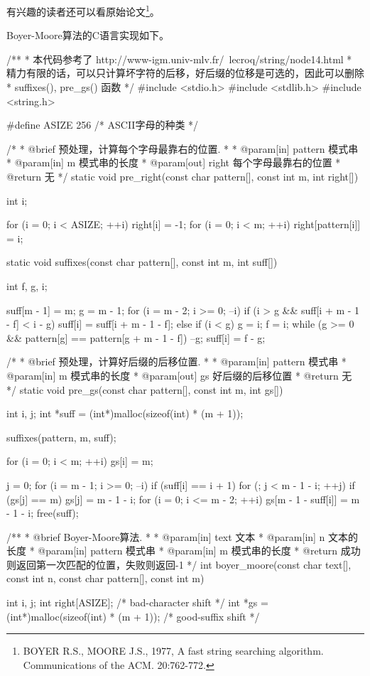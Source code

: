有兴趣的读者还可以看原始论文\footnote{BOYER R.S., MOORE J.S., 1977, A fast string searching algorithm. Communications of the ACM. 20:762-772.}。

Boyer-Moore算法的C语言实现如下。
\begin{Codex}[label=boyer_moore.c]
/**
 * 本代码参考了 http://www-igm.univ-mlv.fr/~lecroq/string/node14.html
 * 精力有限的话，可以只计算坏字符的后移，好后缀的位移是可选的，因此可以删除
 * suffixes(), pre_gs() 函数
 */
#include <stdio.h>
#include <stdlib.h>
#include <string.h>

#define ASIZE 256  /* ASCII字母的种类 */

/*
 * @brief 预处理，计算每个字母最靠右的位置.
 *
 * @param[in] pattern 模式串
 * @param[in] m 模式串的长度
 * @param[out] right 每个字母最靠右的位置
 * @return 无
 */
static void pre_right(const char pattern[], const int m, int right[]) {
    int i;

    for (i = 0; i < ASIZE; ++i) right[i] = -1;
    for (i = 0; i < m; ++i) right[pattern[i]] = i;
}


static void suffixes(const char pattern[], const int m, int suff[]) {
    int f, g, i;

    suff[m - 1] = m;
    g = m - 1;
    for (i = m - 2; i >= 0; --i) {
        if (i > g && suff[i + m - 1 - f] < i - g)
            suff[i] = suff[i + m - 1 - f];
        else {
            if (i < g)
                g = i;
            f = i;
            while (g >= 0 && pattern[g] == pattern[g + m - 1 - f])
                --g;
            suff[i] = f - g;
        }
    }
}

/*
 * @brief 预处理，计算好后缀的后移位置.
 *
 * @param[in] pattern 模式串
 * @param[in] m 模式串的长度
 * @param[out] gs 好后缀的后移位置
 * @return 无
 */
static void pre_gs(const char pattern[], const int m, int gs[]) {
    int i, j;
    int *suff = (int*)malloc(sizeof(int) * (m + 1));

    suffixes(pattern, m, suff);

    for (i = 0; i < m; ++i) gs[i] = m;

    j = 0;
    for (i = m - 1; i >= 0; --i) if (suff[i] == i + 1)
        for (; j < m - 1 - i; ++j) if (gs[j] == m)
            gs[j] = m - 1 - i;
    for (i = 0; i <= m - 2; ++i) 
        gs[m - 1 - suff[i]] = m - 1 - i;
    free(suff);
}

/**
 * @brief Boyer-Moore算法.
 *
 * @param[in] text 文本
 * @param[in] n 文本的长度
 * @param[in] pattern 模式串
 * @param[in] m 模式串的长度
 * @return 成功则返回第一次匹配的位置，失败则返回-1
 */
int boyer_moore(const char text[], const int n, 
                const char pattern[], const int m) {
    int i, j;
    int right[ASIZE];  /* bad-character shift */
    int *gs = (int*)malloc(sizeof(int) * (m + 1));  /* good-suffix shift */

}
\end{Codex}
